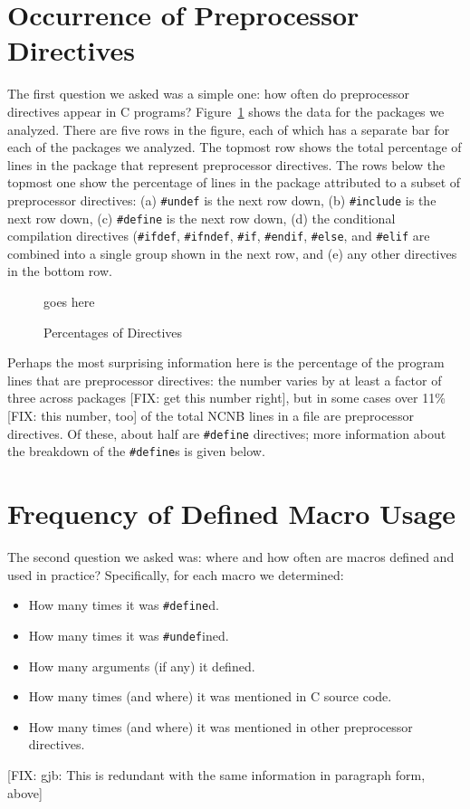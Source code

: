 \section{Occurrence of Preprocessor Directives}\label{sec:directives}

The first question we asked was a simple one: how often do
preprocessor directives appear in C programs?
Figure~\ref{fig:directives} shows the data for the packages we
analyzed.  There are five rows in the figure, each of which has a
separate bar for each of the packages we analyzed.  The topmost row
shows the total percentage of lines in the package that represent
preprocessor directives.  The rows below the topmost one show the
percentage of lines in the package attributed to a subset of
preprocessor directives: (a) \verb+#undef+ is the next row down, (b)
\verb+#include+ is the next row down, (c) \verb+#define+ is the next
row down, (d) the conditional compilation directives (\verb+#ifdef+,
\verb+#ifndef+, \verb+#if+, \verb+#endif+, \verb+#else+, and
\verb+#elif+ are combined into a single group shown in the next row,
and (e) any other directives in the bottom row. 

\begin{figure}
goes here

\caption{Percentages of Directives\label{fig:directives}}
\end{figure}

Perhaps the most surprising information here is the percentage of the
program lines that are preprocessor directives: the number varies by
at least a factor of three across packages [FIX: get this number
right], but in some cases over 11\% [FIX: this number, too] of the
total NCNB lines in a file are preprocessor directives.  Of these,
about half are \verb+#define+ directives; more information about the
breakdown of the \verb+#define+s is given below.

\section{Frequency of Defined Macro Usage}\label{sec:usage}

The second question we asked was: where and how often are macros
defined and used in practice?  Specifically, for each macro we
determined:
\begin{itemize}

\item How many times it was \verb+#define+d.
\item How many times it was \verb+#undef+ined.
\item How many arguments (if any) it defined.
\item How many times (and where) it was mentioned in C source code.
\item How many times (and where) it was mentioned in other
preprocessor directives.

\end{itemize}
[FIX: gjb: This is redundant with the same information in paragraph
form, above]

